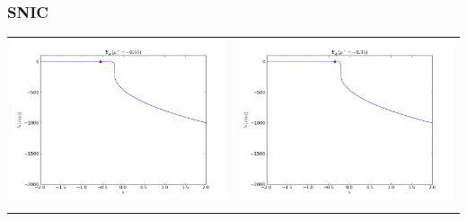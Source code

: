 \documentclass[12pt,a4paper,titlepage]{article}
\begin{document}
\subsubsection{SNIC}
\begin{table}[ht]
\centering
\begin{tabular}{cc}
\includegraphics[scale=0.3]{likelihood_sinc_055m}&\includegraphics[scale=0.3]{likelihood_snic035m}\\
\newline

\end{tabular}
\end{table}
\end{document}
